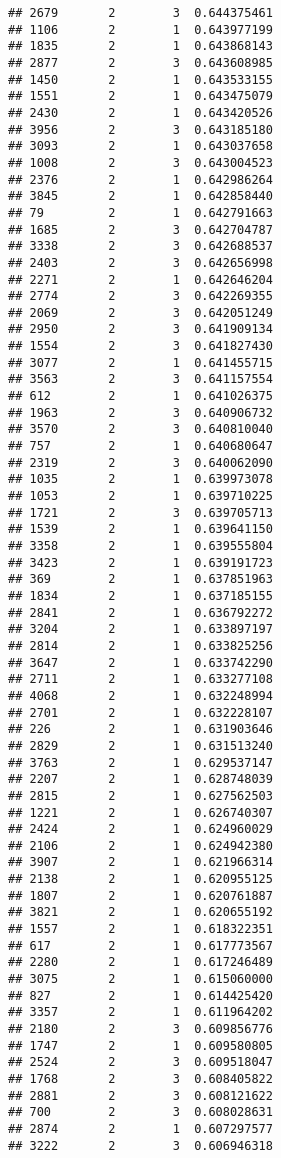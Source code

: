 \documentclass[
]{article}
\begin{document}
\begin{verbatim}
## 2679       2        3  0.644375461
## 1106       2        1  0.643977199
## 1835       2        1  0.643868143
## 2877       2        3  0.643608985
## 1450       2        1  0.643533155
## 1551       2        1  0.643475079
## 2430       2        1  0.643420526
## 3956       2        3  0.643185180
## 3093       2        1  0.643037658
## 1008       2        3  0.643004523
## 2376       2        1  0.642986264
## 3845       2        1  0.642858440
## 79         2        1  0.642791663
## 1685       2        3  0.642704787
## 3338       2        3  0.642688537
## 2403       2        3  0.642656998
## 2271       2        1  0.642646204
## 2774       2        3  0.642269355
## 2069       2        3  0.642051249
## 2950       2        3  0.641909134
## 1554       2        3  0.641827430
## 3077       2        1  0.641455715
## 3563       2        3  0.641157554
## 612        2        1  0.641026375
## 1963       2        3  0.640906732
## 3570       2        3  0.640810040
## 757        2        1  0.640680647
## 2319       2        3  0.640062090
## 1035       2        1  0.639973078
## 1053       2        1  0.639710225
## 1721       2        3  0.639705713
## 1539       2        1  0.639641150
## 3358       2        1  0.639555804
## 3423       2        1  0.639191723
## 369        2        1  0.637851963
## 1834       2        1  0.637185155
## 2841       2        1  0.636792272
## 3204       2        1  0.633897197
## 2814       2        1  0.633825256
## 3647       2        1  0.633742290
## 2711       2        1  0.633277108
## 4068       2        1  0.632248994
## 2701       2        1  0.632228107
## 226        2        1  0.631903646
## 2829       2        1  0.631513240
## 3763       2        1  0.629537147
## 2207       2        1  0.628748039
## 2815       2        1  0.627562503
## 1221       2        1  0.626740307
## 2424       2        1  0.624960029
## 2106       2        1  0.624942380
## 3907       2        1  0.621966314
## 2138       2        1  0.620955125
## 1807       2        1  0.620761887
## 3821       2        1  0.620655192
## 1557       2        1  0.618322351
## 617        2        1  0.617773567
## 2280       2        1  0.617246489
## 3075       2        1  0.615060000
## 827        2        1  0.614425420
## 3357       2        1  0.611964202
## 2180       2        3  0.609856776
## 1747       2        1  0.609580805
## 2524       2        3  0.609518047
## 1768       2        3  0.608405822
## 2881       2        3  0.608121622
## 700        2        3  0.608028631
## 2874       2        1  0.607297577
## 3222       2        3  0.606946318

\end{verbatim}
\end{document}
